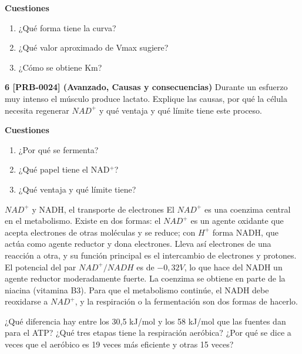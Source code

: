 \documentclass{book}
\begin{document}
\begin{tcolorbox}[title={Ejercicios}, studiumworked, breakable]
\noindent\textbf{Cuestiones}
\begin{enumerate}
\item ¿Qué forma tiene la curva?
\item ¿Qué valor aproximado de Vmax sugiere?
\item ¿Cómo se obtiene Km?
\end{enumerate}

\noindent\textbf{6 [PRB-0024] (Avanzado, Causas y consecuencias)}
Durante un esfuerzo muy intenso el músculo produce lactato. Explique las causas, por qué la célula necesita regenerar \(NAD^{+}\) y qué ventaja y qué límite tiene este proceso.


\noindent\textbf{Cuestiones}
\begin{enumerate}
\item ¿Por qué se fermenta?
\item ¿Qué papel tiene el NAD\({}^{+}\)?
\item ¿Qué ventaja y qué límite tiene?
\end{enumerate}
\end{tcolorbox}

\begin{tcolorbox}[title={Autoficha}, studiumcheck, breakable]

\(NAD^{+}\) y NADH, el transporte de electrones
El \(NAD^{+}\) es una coenzima central en el metabolismo. Existe en dos formas: el \(NAD^{+}\) es un agente oxidante que acepta electrones de otras moléculas y se reduce; con \(H^{+}\) forma NADH, que actúa como agente reductor y dona electrones. Lleva así electrones de una reacción a otra, y su función principal es el intercambio de electrones y protones. El potencial del par \(NAD^{+}/NADH\) es de \(-0,32 V\), lo que hace del NADH un agente reductor moderadamente fuerte. La coenzima se obtiene en parte de la niacina (vitamina B3). Para que el metabolismo continúe, el NADH debe reoxidarse a \(NAD^{+}\), y la respiración o la fermentación son dos formas de hacerlo.


¿Qué diferencia hay entre los 30,5 kJ/mol y los 58 kJ/mol que las fuentes dan para el ATP? ¿Qué tres etapas tiene la respiración aeróbica? ¿Por qué se dice a veces que el aeróbico es 19 veces más eficiente y otras 15 veces?

\end{tcolorbox}
\end{document}
